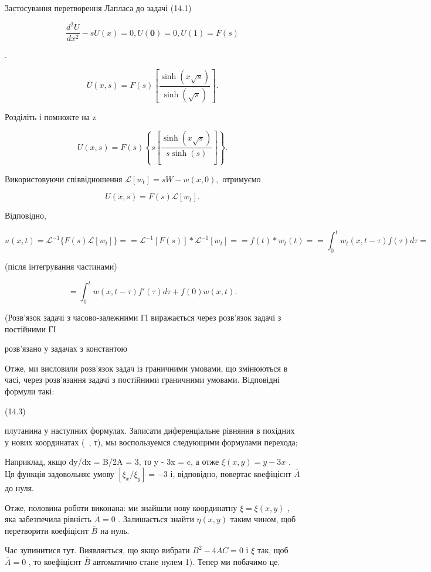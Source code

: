\documentclass[
  ukrainian,
]{article}
\begin{document}
Застосування перетворення Лапласа до задачі (14.1)

\[
\frac{d^2U}{dx^2} - sU(x) = 0,
U\left( \mathbf{0}\right) =0,
U(1) = F(s)
\]

.

\[
U(x, s) = F(s) \left[ \frac{\sinh(x \sqrt{s})}{\sinh(\sqrt{s})} \right].
\]

Розділіть і помножте на z

\[
U(x, s) = F(s) \left\{ s \left[ \frac{\sinh(x \sqrt{s})}{s \sinh(s)} \right] \right\}.
\]

Використовуючи співвідношення \(\mathscr{L}[w_t] = sW - w(x, 0),\)
отримуємо

\[
U(x, s) = F(s) \mathcal{L}[w_t].
\]

Відповідно,

\[
u(x, t) = \mathcal{L}^{-1} \{ F(s) \mathcal{L}[w_t] \} =
= \mathcal{L}^{-1} [ F(s) ] * \mathcal{L}^{-1}[w_t] =
= f(t) * w_t(t) =
= \int_0^t w_t(x, t-\tau) f(\tau) d\tau =
\]

(після інтегрування частинами)

\[
= \int_{0}^{t} w(x, t-\tau) f'(\tau) d\tau + f(0) w(x, t).
\]

(Розв'язок задачі з часово-залежними ГІ виражається через розв'язок
задачі з постійними ГІ

розв'язано у задачах з константою

Отже, ми висловили розв'язок задач із граничними умовами, що змінюються
в часі, через розв'язання задачі з постійними граничними умовами.
Відповідні формули такі:

(14.3)

плутанина у наступних формулах. Записати диференціальне рівняння в
похідних у нових координатах (~, т), мы воспользуемся следующими
формулами перехода;

Наприклад, якщо dy/dx = B/2A = 3, то y - 3x = c, а отже
\(\xi(x, y) = y - 3x\) . Ця функція задовольняє умову
\([\xi_x/\xi_y] = -3\) і, відповідно, повертає коефіцієнт
\(\overline{A}\) до нуля.

Отже, половина роботи виконана: ми знайшли нову координатну
\(\xi = \xi(x, y)\) , яка забезпечила рівність \(\overline{A} = 0\) .
Залишається знайти \(\eta(x, y)\) таким чином, щоб перетворити
коефіцієнт \(\overline{B}\) на нуль.

Час зупинитися тут. Виявляється, що якщо вибрати \(B^2-4AC=0\) і \(\xi\)
так, щоб \(\overline{A}=0\) , то коефіцієнт \(\overline{B}\) автоматично
стане нулем 1). Тепер ми побачимо це.
\end{document}
